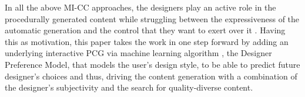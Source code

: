 In all the above MI-CC approaches, the designers play an active role in the procedurally generated content while struggling between the expressiveness of the automatic generation and the control that they want to exert over it . Having this as motivation, this paper takes the work in  one step forward by adding an underlying interactive PCG via machine learning algorithm , the Designer Preference Model, that models the user's design style, to be able to predict future designer's choices and thus, driving the content generation with a combination of the designer's subjectivity and the search for quality-diverse content.



